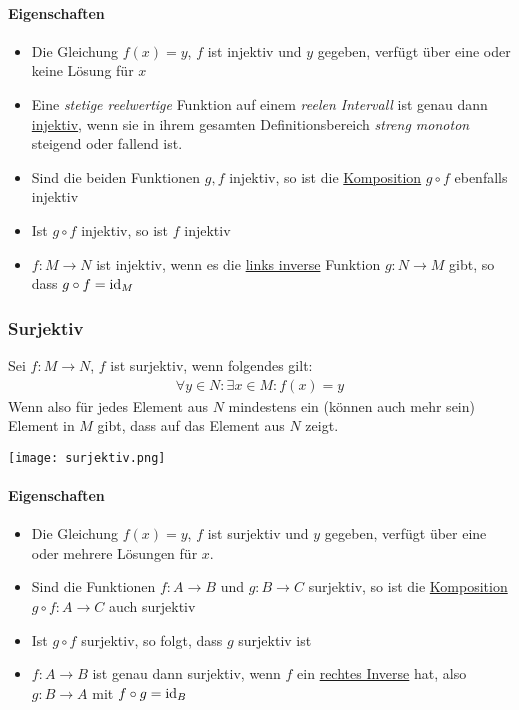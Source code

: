 \paragraph{Eigenschaften}
\begin{itemize}
	\item Die Gleichung $f(x) = y$, $f$ ist injektiv und $y$ gegeben, verfügt über eine oder keine Lösung für $x$
	\item Eine \textit{stetige reelwertige} Funktion auf einem \textit{reelen Intervall} ist genau dann \underline{injektiv}, wenn sie in ihrem gesamten Definitionsbereich \textit{streng monoton} steigend oder fallend ist.
	\item Sind die beiden Funktionen $g, f$ injektiv, so ist die \underline{Komposition} $g \circ f$ ebenfalls injektiv
	\item Ist $g \circ f$ injektiv, so ist $f$ injektiv
	\item $f: M \rightarrow N$ ist injektiv, wenn es die \underline{links inverse} Funktion $g: N \rightarrow M$ gibt, so dass $g \circ f = \operatorname{id}_M$
\end{itemize}

\subsubsection{Surjektiv}
Sei $f: M \rightarrow N$, $f$ ist surjektiv, wenn folgendes gilt:
\begin{align*}
\forall y \in N: \exists x \in M: f(x) = y
\end{align*}
Wenn also für jedes Element aus $N$ mindestens ein (können auch mehr sein) Element in $M$ gibt, dass auf das Element aus $N$ zeigt.

\texttt{[image: surjektiv.png]}

\paragraph{Eigenschaften}
\begin{itemize}
	\item Die Gleichung $f(x) = y$, $f$ ist surjektiv und $y$ gegeben, verfügt über eine oder mehrere Lösungen für $x$.
	\item Sind die Funktionen $f: A \rightarrow B$ und $g: B \rightarrow C$ surjektiv, so ist die \underline{Komposition} $g \circ f: A \rightarrow C$ auch surjektiv
	\item Ist $g \circ f$ surjektiv, so folgt, dass $g$ surjektiv ist
	\item $f: A \rightarrow B$ ist genau dann surjektiv, wenn $f$ ein \underline{rechtes Inverse} hat, also $g: B \rightarrow A$ mit $f \circ g = \operatorname{id}_B$
\end{itemize}

